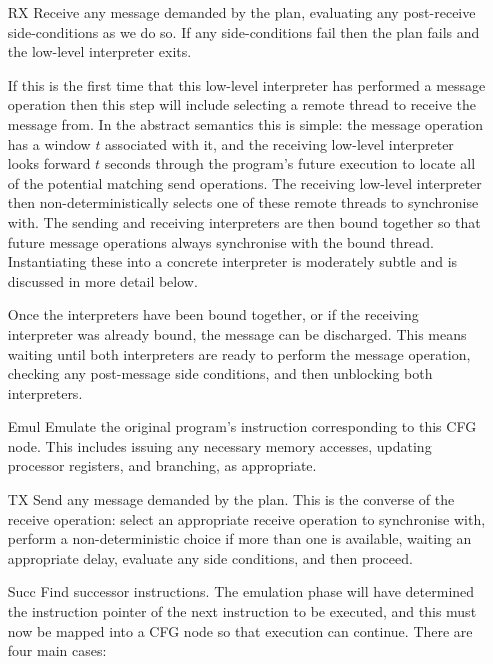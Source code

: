 \begin{itemize}
\item[RX] Receive any message demanded by the plan, evaluating any
  post-receive side-conditions as we do so.  If any side-conditions
  fail then the plan fails and the low-level interpreter exits.

  If this is the first time that this low-level interpreter has
  performed a message operation then this step will include selecting
  a remote thread to receive the message from.  In the abstract
  semantics this is simple: the message operation has a window $t$
  associated with it, and the receiving low-level interpreter looks
  forward $t$ seconds through the program's future execution to locate
  all of the potential matching send operations.  The receiving
  low-level interpreter then non-deterministically selects one of
  these remote threads to synchronise with.  The sending and receiving
  interpreters are then bound together so that future message
  operations always synchronise with the bound thread.  Instantiating
  these into a concrete interpreter is moderately subtle and is
  discussed in more detail below.

  Once the interpreters have been bound together, or if the receiving
  interpreter was already bound, the message can be discharged.  This
  means waiting until both interpreters are ready to perform the
  message operation, checking any post-message side conditions,
  and then unblocking both interpreters.

\item[Emul] Emulate the original program's instruction corresponding
  to this CFG node.  This includes issuing any necessary memory
  accesses, updating processor registers, and branching, as
  appropriate.
\item[TX] Send any message demanded by the plan.  This is the converse
  of the receive operation: select an appropriate receive operation to
  synchronise with, perform a non-deterministic choice if more than
  one is available, waiting an appropriate delay, evaluate any side
  conditions, and then proceed.
\item[Succ] Find successor instructions.  The emulation phase will
  have determined the instruction pointer of the next instruction to
  be executed, and this must now be mapped into a CFG node so that
  execution can continue.  There are four main cases:


\end{itemize}
